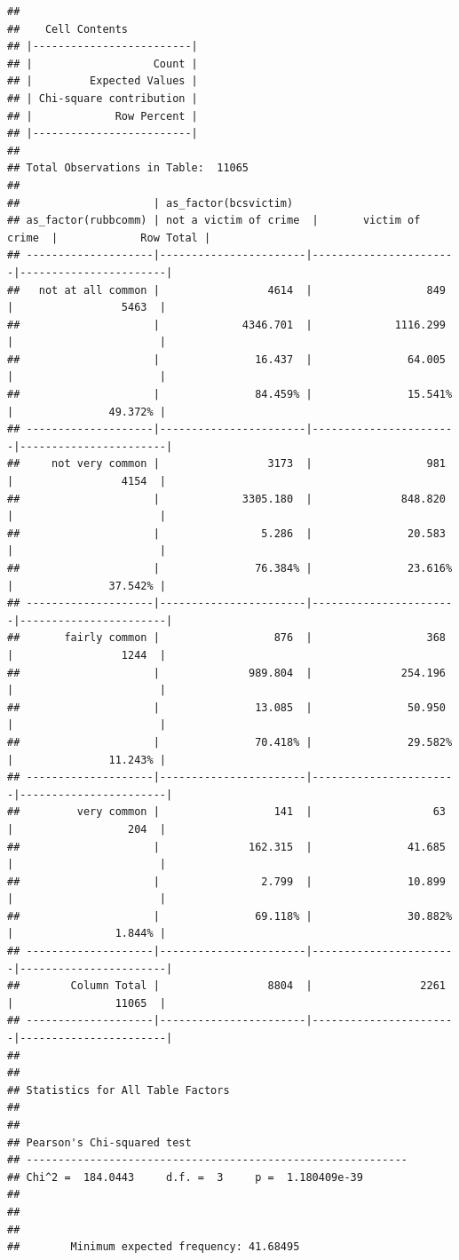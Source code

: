 \documentclass[
]{book}
\begin{document}
\begin{verbatim}
## 
##    Cell Contents
## |-------------------------|
## |                   Count |
## |         Expected Values |
## | Chi-square contribution |
## |             Row Percent |
## |-------------------------|
## 
## Total Observations in Table:  11065 
## 
##                     | as_factor(bcsvictim) 
## as_factor(rubbcomm) | not a victim of crime  |       victim of crime  |             Row Total | 
## --------------------|-----------------------|-----------------------|-----------------------|
##   not at all common |                 4614  |                  849  |                 5463  | 
##                     |             4346.701  |             1116.299  |                       | 
##                     |               16.437  |               64.005  |                       | 
##                     |               84.459% |               15.541% |               49.372% | 
## --------------------|-----------------------|-----------------------|-----------------------|
##     not very common |                 3173  |                  981  |                 4154  | 
##                     |             3305.180  |              848.820  |                       | 
##                     |                5.286  |               20.583  |                       | 
##                     |               76.384% |               23.616% |               37.542% | 
## --------------------|-----------------------|-----------------------|-----------------------|
##       fairly common |                  876  |                  368  |                 1244  | 
##                     |              989.804  |              254.196  |                       | 
##                     |               13.085  |               50.950  |                       | 
##                     |               70.418% |               29.582% |               11.243% | 
## --------------------|-----------------------|-----------------------|-----------------------|
##         very common |                  141  |                   63  |                  204  | 
##                     |              162.315  |               41.685  |                       | 
##                     |                2.799  |               10.899  |                       | 
##                     |               69.118% |               30.882% |                1.844% | 
## --------------------|-----------------------|-----------------------|-----------------------|
##        Column Total |                 8804  |                 2261  |                11065  | 
## --------------------|-----------------------|-----------------------|-----------------------|
## 
##  
## Statistics for All Table Factors
## 
## 
## Pearson's Chi-squared test 
## ------------------------------------------------------------
## Chi^2 =  184.0443     d.f. =  3     p =  1.180409e-39 
## 
## 
##  
##        Minimum expected frequency: 41.68495
\end{verbatim}
\end{document}
